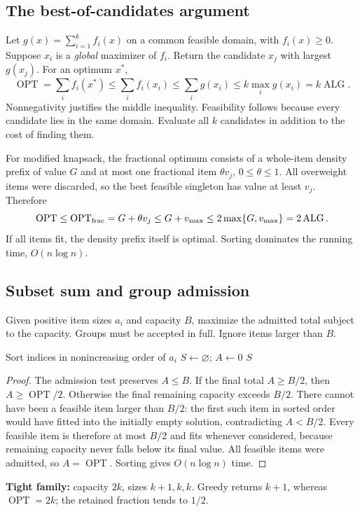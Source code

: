 \documentclass[10pt]{article}
\theoremstyle{definition}
\newcommand{\OPT}{\operatorname{OPT}}
\newcommand{\ALG}{\operatorname{ALG}}
\begin{document}
\subsection{The best-of-candidates argument}
\label{gre:best}
Let $g(x)=\sum_{i=1}^k f_i(x)$ on a common feasible domain, with $f_i(x)\ge0$.
Suppose $x_i$ is a \emph{global} maximizer of $f_i$. Return the candidate $x_j$ with
largest $g(x_j)$. For an optimum $x^*$,
\[
\OPT=\sum_i f_i(x^*)\le\sum_i f_i(x_i)
\le\sum_i g(x_i)\le k\max_i g(x_i)=k\ALG.
\]
Nonnegativity justifies the middle inequality. Feasibility follows because every candidate
lies in the same domain. Evaluate all $k$ candidates in addition to the cost of finding them.

For modified knapsack, the fractional optimum consists of a whole-item density prefix
of value $G$ and at most one fractional item $\theta v_j$, $0\le\theta\le1$. All overweight
items were discarded, so the best feasible singleton has value at least $v_j$. Therefore
\[
\OPT\le\OPT_{\rm frac}=G+\theta v_j\le G+v_{\max}
\le2\max\{G,v_{\max}\}=2\ALG.
\]
If all items fit, the density prefix itself is optimal. Sorting dominates the running time,
$O(n\log n)$.

\subsection{Subset sum and group admission}
\label{gre:subset}
Given positive item sizes $a_i$ and capacity $B$, maximize the admitted total subject to
the capacity. Groups must be accepted in full. Ignore items larger than $B$.

\begin{algorithm}[H]
\caption{Largest-first admission}
Sort indices in nonincreasing order of $a_i$\;
$S\gets\varnothing$; $A\gets0$\;
\Return $S$\;
\end{algorithm}
\begin{proof}
The admission test preserves $A\le B$. If the final total $A\ge B/2$, then
$A\ge\OPT/2$. Otherwise the final remaining capacity exceeds $B/2$.
There cannot have been a feasible item larger than $B/2$: the first such item in sorted
order would have fitted into the initially empty solution, contradicting $A<B/2$.
Every feasible item is therefore at most $B/2$ and fits whenever considered, because
remaining capacity never falls below its final value. All feasible items were admitted,
so $A=\OPT$. Sorting gives $O(n\log n)$ time.
\end{proof}
\textbf{Tight family:} capacity $2k$, sizes $k+1,k,k$. Greedy returns $k+1$, whereas
$\OPT=2k$; the retained fraction tends to $1/2$.
\end{document}
